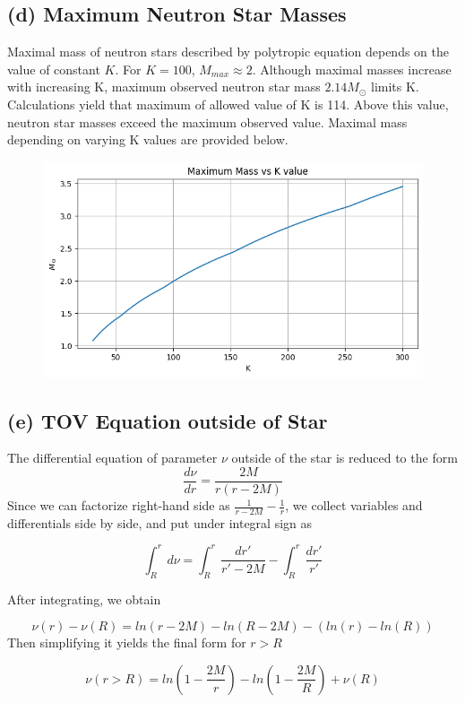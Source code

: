 \documentclass[aps,twocolumn,showpacs,preprintnumbers,nofootinbib,prl,superscriptaddress,groupedaddress]{revtex4-2}
\begin{document}
\subsection{(d) Maximum Neutron Star Masses}

Maximal mass of neutron stars described by polytropic equation depends on the value of constant $K$. For $K = 100$, $M_{max} \approx 2$. Although maximal masses increase with increasing K, maximum observed neutron star mass $2.14M_\odot$ limits K. Calculations yield that maximum of allowed value of K is 114. Above this value, neutron star masses exceed the maximum observed value. Maximal mass depending on varying K values are provided below.

\begin{figure}[H]
	\centering
	\includegraphics[width=1\linewidth]{Plots/einstein-part-d}
\end{figure}
\FloatBarrier

\subsection{(e) TOV Equation outside of Star}

The differential equation of parameter $\nu$ outside of the star is reduced to the form
\begin{equation}
	\frac{d\nu}{dr} = \frac{2M}{r(r-2M)}
\end{equation}
Since we can factorize right-hand side as $\frac{1}{r-2M}-\frac{1}{r}$, we collect variables and differentials side by side, and put under integral sign as

\begin{equation}
	\int_R^{r}d\nu  =\int_R^{r}\frac{dr'}{r'-2M}-\int_R^{r}\frac{dr'}{r'}
\end{equation}

After integrating, we obtain

\begin{equation}
	\nu(r)-\nu(R)  = ln(r-2M)-ln(R-2M)-(ln(r)-ln(R))
\end{equation}
Then simplifying it yields the final form for $r > R$

\begin{equation}
	\nu(r > R)  = ln(1-\frac{2M}{r})-ln(1-\frac{2M}{R}) + \nu(R)
\end{equation}
\end{document}
